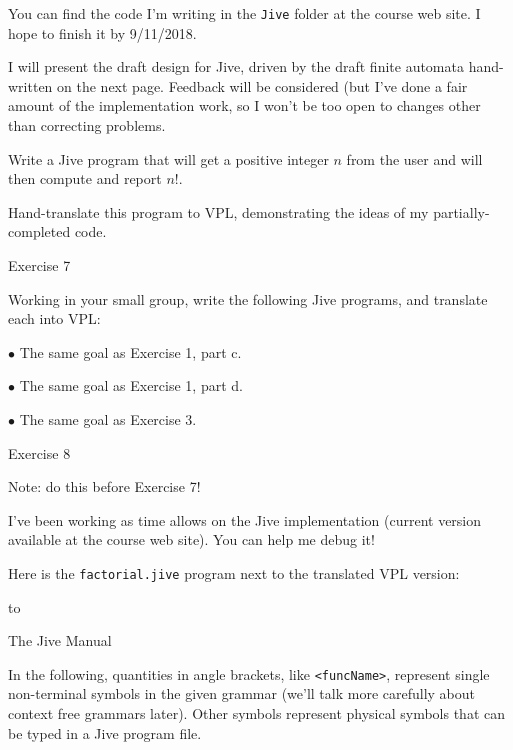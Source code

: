 You can find the code I'm writing in the {\tt Jive} folder at the course web site.  I hope to finish it by 9/11/2018.
\medskip

\doit I will present the draft design for Jive, driven by the draft finite automata hand-written on the next page.
Feedback will be considered (but I've done a fair amount of the implementation work, so I won't
be too open to changes other than correcting problems.
\medskip

\doit Write a Jive program that will get a positive integer $n$ from the user and will then compute and
report $n!$.
\medskip

\doit Hand-translate this program to VPL, demonstrating the ideas of my partially-completed code.
\border

{\bigboldfont Exercise 7}
\medskip

Working in your small group, write the following Jive programs, and translate each into VPL:
\medskip

\item{$\bullet$} The same goal as Exercise 1, part c.
\medskip

\item{$\bullet$} The same goal as Exercise 1, part d.
\medskip

\item{$\bullet$} The same goal as Exercise 3.

\medskip
\Outdent

\vfil\eject

{\bigboldfont Exercise 8}
\medskip

Note:  do this before Exercise 7!
\medskip

I've been working as time allows on the Jive implementation (current version available at the course web site).
You can help me debug it!
\medskip

Here is the {\tt factorial.jive} program next to the translated VPL version:
\bigskip\bigskip

\hbox to 

\vfil\eject

{\bigboldfont The Jive Manual}
\bigskip

In the following, quantities in angle brackets, like {\tt <funcName>}, represent single
non-terminal symbols in the given grammar (we'll talk more carefully about context free grammars later).
Other symbols represent physical symbols that can be typed in a Jive program file.
\medskip

